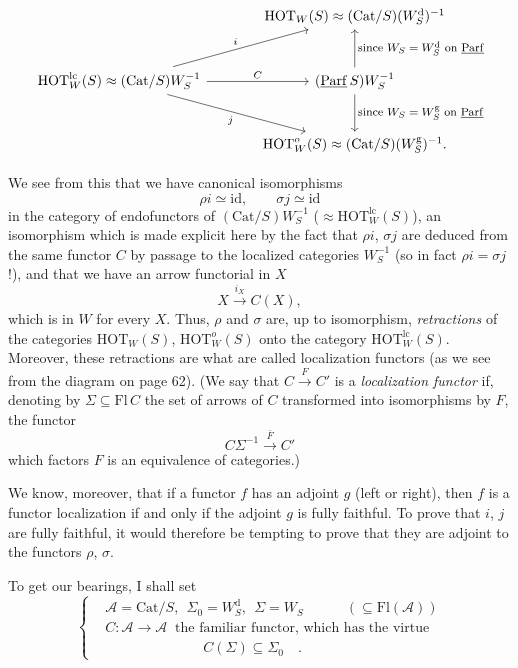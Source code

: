 \documentclass[11pt]{article}
\newcommand{\printedpage}[1]{\marginpar{\footnotesize p.~#1}}
\newcommand{\msp}[1]{\marginpar{\footnotesize [#1]}}
\newcommand{\HOT}{\mathrm{HOT}}
\newcommand{\Cat}{\mathrm{Cat}}
\newcommand{\Fl}{\mathrm{Fl}}
\newcommand{\id}{\mathrm{id}}
\newcommand{\cA}{\mathcal{A}}
\newcommand{\ul}[1]{\underline{\mathrm{#1}}}
\begin{document}
\printedpage{39}

\[
\begin{tikzcd}[column sep=large, row sep=large]
 & \HOT_W(S)\approx(\Cat/S)(W_S^{\mathrm{d}})^{-1} \\
\HOT^{\mathrm{lc}}_W(S)\approx(\Cat/S)W_S^{-1} \arrow[ur, "i"] \arrow[r, "C"] \arrow[dr, "j"'] & (\ul{Parf}\,S)W_S^{-1} \arrow[u, "\text{\footnotesize since $W_S=W_S^{\mathrm{d}}$ on $\ul{Parf}$}"'] \arrow[d, "\text{\footnotesize since $W_S=W_S^{\mathrm{g}}$ on $\ul{Parf}$}"] \\
 & \HOT^{o}_W(S)\approx(\Cat/S)(W_S^{\mathrm{g}})^{-1}.
\end{tikzcd}
\]

\msp{page 64}
We see from this that we have canonical isomorphisms
\[
\rho i\simeq\id,\qquad\sigma j\simeq\id
\]
in the category of endofunctors of $(\Cat/S)W_S^{-1}$ ($\approx\HOT^{\mathrm{lc}}_W(S)$), an isomorphism which is made explicit here by the fact that $\rho i$, $\sigma j$ are deduced from the same functor $C$ by passage to the localized categories $W_S^{-1}$ (so in fact $\rho i=\sigma j$ !), and that we have an arrow functorial in $X$
\[
X\xrightarrow{i_X}C(X),
\]
which is in $W$ for every $X$. Thus, $\rho$ and $\sigma$ are, up to isomorphism, \textit{retractions} of the categories $\HOT_W(S)$, $\HOT^{o}_W(S)$ onto the category $\HOT^{\mathrm{lc}}_W(S)$. Moreover, these retractions are what are called localization functors (as we see from the diagram on page 62). (We say that $C\xrightarrow{F}C'$ is a \textit{localization functor} if, denoting by $\Sigma\subseteq\Fl\,C$ the set of arrows of $C$ transformed into isomorphisms by $F$, the functor
\[
C\Sigma^{-1}\xrightarrow{\bar{F}}C'
\]
which factors $F$ is an equivalence of categories.)

\msp{page 65}
We know, moreover, that if a functor $f$ has an adjoint $g$ (left or right), then $f$ is a functor localization if and only if the adjoint $g$ is fully faithful. To prove that $i$, $j$ are fully faithful, it would therefore be tempting to prove that they are adjoint to the functors $\rho$, $\sigma$.

To get our bearings, I shall set
\[
\left\{
\begin{aligned}
&\cA=\Cat/S,\ \ \Sigma_0=W_S^{\mathrm{d}},\ \ \Sigma=W_S\qquad\quad(\subseteq\Fl(\cA))\\
&C:\cA\longrightarrow\cA\ \text{ the familiar functor, which has the virtue}\\
&\qquad\qquad\qquad\quad C(\Sigma)\subseteq\Sigma_0\quad.
\end{aligned}
\right.
\]
\end{document}
